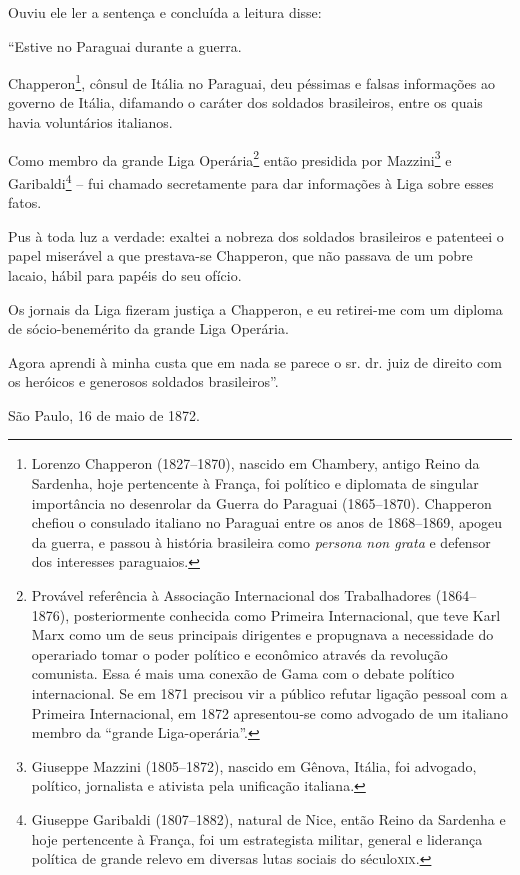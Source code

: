 {Ouviu ele ler a sentença e concluída a leitura disse:

``Estive no Paraguai durante a guerra.

Chapperon\footnote{ Lorenzo Chapperon (1827--1870), nascido em Chambery,
  antigo Reino da Sardenha, hoje pertencente à França, foi político e
  diplomata de singular importância no desenrolar da Guerra do Paraguai
  (1865--1870). Chapperon chefiou o consulado italiano no Paraguai entre
  os anos de 1868--1869, apogeu da guerra, e passou à história brasileira
  como \emph{persona non grata} e defensor dos interesses paraguaios.},
cônsul de Itália no Paraguai, deu péssimas e falsas informações ao
governo de Itália, difamando o caráter dos soldados brasileiros, entre
os quais havia voluntários italianos.

Como membro da grande Liga Operária\footnote{ Provável referência à
  Associação Internacional dos Trabalhadores (1864--1876), posteriormente
  conhecida como Primeira Internacional, que teve Karl Marx como um de
  seus principais dirigentes e propugnava a necessidade do operariado
  tomar o poder político e econômico através da revolução comunista.
  Essa é mais uma conexão de Gama com o debate político internacional.
  Se em 1871 precisou vir a público refutar ligação pessoal com a
  Primeira Internacional, em 1872 apresentou-se como advogado de um
  italiano membro da ``grande Liga-operária''.} então presidida por
Mazzini\footnote{ Giuseppe Mazzini (1805--1872), nascido em Gênova,
  Itália, foi advogado, político, jornalista e ativista pela unificação
  italiana.} e Garibaldi\footnote{ Giuseppe Garibaldi (1807--1882),
  natural de Nice, então Reino da Sardenha e hoje pertencente à França,
  foi um estrategista militar, general e liderança política de grande
  relevo em diversas lutas sociais do século\textsc{xix}.} -- fui chamado
secretamente para dar informações à Liga sobre esses fatos.

Pus à toda luz a verdade: exaltei a nobreza dos soldados brasileiros e
patenteei o papel miserável a que prestava-se Chapperon, que não passava
de um pobre lacaio, hábil para papéis do seu ofício.

Os jornais da Liga fizeram justiça a Chapperon, e eu retirei-me com um
diploma de sócio-benemérito da grande Liga Operária.

Agora aprendi à minha custa que em nada se parece o sr. dr. juiz de
direito com os heróicos e generosos soldados brasileiros''.
\begin{flushright}
São Paulo, 16 de maio de 1872.


\end{flushright}}
